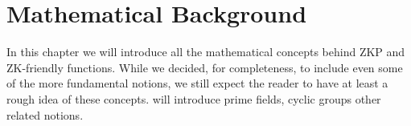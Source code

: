 \chapter{Mathematical Background}
In this chapter we will introduce all the mathematical concepts behind ZKP and ZK-friendly 
functions.
While we decided, for completeness, to include even some of the more fundamental notions, we still
expect the reader to have at least a rough idea of these concepts.
 will introduce prime fields, cyclic groups other related notions.  



